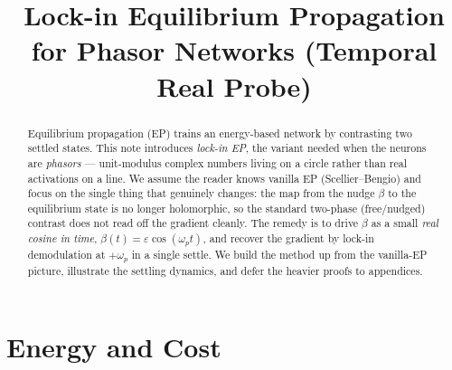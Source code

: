 \documentclass[11pt]{article}
\title{Lock-in Equilibrium Propagation\\
for Phasor Networks (Temporal Real Probe)}
\author{}
\date{}
\theoremstyle{definition}
\begin{document}
\maketitle

\begin{abstract}
\noindent
Equilibrium propagation (EP) trains an energy-based network by
contrasting two settled states.  This note introduces \emph{lock-in
EP}, the variant needed when the neurons are \emph{phasors} ---
unit-modulus complex numbers living on a circle rather than real
activations on a line.  We assume the reader knows vanilla EP
(Scellier--Bengio) and focus on the single thing that genuinely
changes: the map from the nudge $\beta$ to the equilibrium state is no
longer holomorphic, so the standard two-phase (free/nudged) contrast
does not read off the gradient cleanly.  The remedy is to drive
$\beta$ as a small \emph{real cosine in time}, $\beta(t)=\varepsilon
\cos(\omega_p t)$, and recover the gradient by lock-in demodulation at
$+\omega_p$ in a single settle.  We build the method up from the
vanilla-EP picture, illustrate the settling dynamics, and defer the
heavier proofs to appendices.
\end{abstract}

\begin{center}\end{center}

\section{Energy and Cost}\label{sec:energy-cost}
\end{document}

